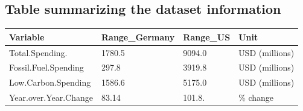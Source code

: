 \documentclass[
  12pt,
]{article}
\begin{document}
\hypertarget{table-summarizing-the-dataset-information}{%
\subsection{Table summarizing the dataset
information}\label{table-summarizing-the-dataset-information}}

\begin{longtable}[]{@{}llll@{}}
\toprule()
Variable & Range\_Germany & Range\_US & Unit \\
\midrule()
\endhead
Total.Spending. & 1780.5 & 9094.0 & USD (millions) \\
Fossil.Fuel.Spending & 297.8 & 3919.8 & USD (millions) \\
Low.Carbon.Spending & 1586.6 & 5175.0 & USD (millions) \\
Year.over.Year.Change & 83.14 & 101.8. & \% change \\
\bottomrule()
\end{longtable}
\end{document}
